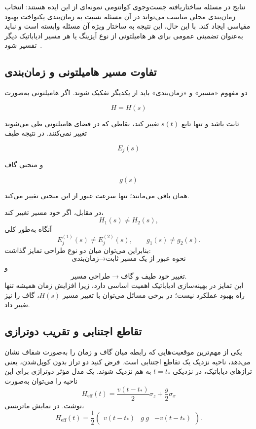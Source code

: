 نتایج  در مسئله ساختاریافته جست‌وجوی کوانتومی
نمونه‌ای از این ایده هستند: انتخاب زمان‌بندی محلی مناسب می‌تواند
در آن مسئله نسبت به زمان‌بندی یکنواخت بهبود مقیاسی ایجاد کند.
با این حال، این نتیجه به ساختار ویژه آن مسئله وابسته است و نباید
به‌عنوان تضمینی عمومی برای هر هامیلتونی از نوع آیزینگ یا هر مسیر
ادیاباتیک دیگر تفسیر شود~\cite{GapRoland2002}.

\subsection{تفاوت مسیر هامیلتونی و زمان‌بندی}

دو مفهوم «مسیر» و «زمان‌بندی» باید از یکدیگر تفکیک شوند. اگر
هامیلتونی به‌صورت

$$
H=H(s)
$$

ثابت باشد و تنها تابع $s(t)$ تغییر کند، نقاطی که در فضای هامیلتونی
طی می‌شوند تغییر نمی‌کنند. در نتیجه طیف

$$
E_j(s)
$$

و منحنی گاف

$$
g(s)
$$

همان باقی می‌مانند؛ تنها سرعت عبور از این منحنی تغییر می‌کند.

در مقابل، اگر خود مسیر تغییر کند،
\begin{equation}
	H_1(s)\neq H_2(s),
\end{equation}
آنگاه به‌طور کلی
\begin{equation}
	E_j^{(1)}(s)\neq E_j^{(2)}(s),
	\qquad
	g_1(s)\neq g_2(s).
\end{equation}
بنابراین می‌توان میان دو نوع طراحی تمایز گذاشت:
\begin{equation}
	\boxed{
		\text{زمان‌بندی}
		\longrightarrow
		\text{نحوه عبور از یک مسیر ثابت}
	}
\end{equation}
و
\begin{equation}
	\boxed{
		\text{طراحی مسیر}
		\longrightarrow
		\text{تغییر خود طیف و گاف}.
	}
\end{equation}
این تمایز در بهینه‌سازی ادیاباتیک اهمیت اساسی دارد، زیرا افزایش
زمان همیشه تنها راه بهبود عملکرد نیست؛ در برخی مسائل می‌توان با
تغییر مسیر $H(s)$، گاف را نیز تغییر داد.

\subsection{تقاطع اجتنابی و تقریب دو‌ترازی}

یکی از مهم‌ترین موقعیت‌هایی که رابطه میان گاف و زمان را به‌صورت
شفاف نشان می‌دهد، ناحیه نزدیک یک تقاطع اجتنابی است. فرض کنید دو
تراز بدون کوپل‌شدن، یعنی ترازهای دیاباتیک، در نزدیکی
$t=t_*$ به هم نزدیک شوند. یک مدل مؤثر دو‌ترازی برای این ناحیه را
می‌توان به‌صورت
\begin{equation}
	H_{\mathrm{eff}}(t)=
	\frac{v(t-t_*)}{2}\sigma_z
	+
	\frac{g}{2}\sigma_x
	\label{eq:landau-zener-hamiltonian}
\end{equation}
نوشت. در نمایش ماتریسی،
\begin{equation}
	H_{\mathrm{eff}}(t)=
	\frac{1}{2}
	\begin{pmatrix}
		v(t-t_*)&g\
		g&-v(t-t_*)
	\end{pmatrix}.
\end{equation}

